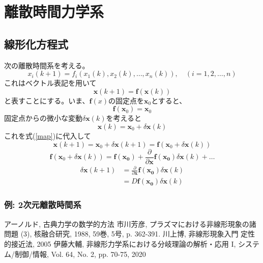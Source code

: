 \documentclass[]{jlreq}
\begin{document}
\section{離散時間力学系}
\subsection{線形化方程式}

次の離散時間系を考える。
%
\begin{equation}
    x_i(k+1) = f_i(x_1(k),x_2(k),\dots, x_n(k)), \quad (i = 1,2,\dots,n)
\end{equation}
%
これはベクトル表記を用いて
%
\begin{equation}
    \bm{x}(k+1) = \bm{f}(\bm{x}(k))
    \label{map}
\end{equation}
%
と表すことにする。いま、$\bm{f}(x)$の固定点を$\bm{x}_0$とすると、
%
\begin{equation}
    \bm{f}(\bm{x}_0) = \bm{x}_0
\end{equation}
%
固定点からの微小な変動$\delta \bm{x}(k)$を考えると
%
\begin{equation}
    \bm{x}(k) = \bm{x}_0 + \delta \bm{x}(k)
\end{equation}
%
これを式(\ref{map})に代入して
%
\begin{equation}
    \bm{x}(k+1) = \bm{x}_0 + \delta \bm{x}(k+1) = \bm{f}(\bm{x}_0+\delta \bm{x}(k))
\end{equation}
%
\begin{equation}
    \bm{f}(\bm{x}_0+\delta \bm{x}(k)) = \bm{f}(\bm{x_0})+\frac{\partial}{\partial\bm{x}}\bm{f}(\bm{x_0})\delta \bm{x}(k) + \dots
\end{equation}
%
\begin{align}
    \delta\bm{x}(k+1) &= \frac{\partial}{\partial\bm{x}}\bm{f}(\bm{x_0})\delta \bm{x}(k) \\
        &= D\bm{f}(\bm{x_0})\delta\bm{x}(k)
\end{align}
%
\subsubsection{例: 2次元離散時間系}
%
\begin{thebibliography}{9}
    アーノルド, 古典力学の数学的方法
    市川芳彦, プラズマにおける非線形現象の諸問題 (3), 核融合研究, 1988, 59巻, 5号, p. 362-391.
    川上博, 非線形現象入門 定性的接近法, 2005
    伊藤大輔, 非線形力学系における分岐理論の解析・応用 I, システム/制御/情報, Vol. 64, No. 2, pp. 70-75, 2020
  \end{thebibliography}
%
\end{document}
